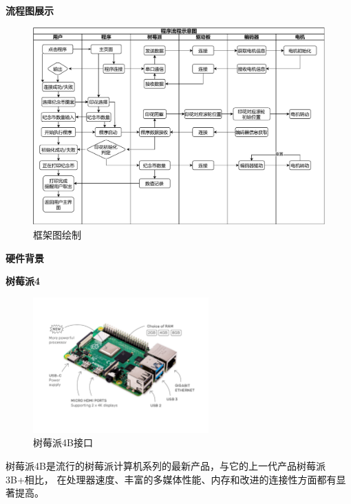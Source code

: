 \documentclass[UTF8,14pt]{article}
\newcommand\sectionone[1]{\centerline{\Large{\bfseries{#1}}}}
\begin{document}
\vspace{0.5cm}
\sectionone{流程图展示}
\begin{figure}[h]
	\centering
	\includegraphics[width=13.5cm]{figures/框架图绘制.pdf}
	\vspace{-10pt}
	\caption{框架图绘制}
	\vspace{-10pt}
\end{figure}

\sectionone{硬件背景}

\centerline{\large{\bfseries{树莓派4}}}

\begin{figure}%
	\vspace{-0.4cm}
	\centering
	\includegraphics[width=6.75cm]{figures/raspberry4.pdf}
	\vspace{-15pt}
	\caption{树莓派4B接口}
	\vspace{-15pt}
\end{figure}
树莓派4B是流行的树莓派计算机系列的最新产品，与它的上一代产品树莓派3B+相比，
在处理器速度、丰富的多媒体性能、内存和改进的连接性方面都有显著提高。
\end{document}
